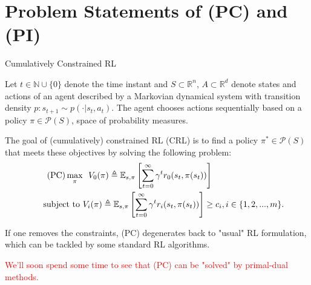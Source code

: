 \documentclass[aspectratio=43, 10pt]{beamer}
\begin{document}
\section{Problem Statements of (PC) and (PI)}    
    \begin{frame}{Cumulatively Constrained RL}

        Let $t \in \mathbb{N} \cup \{0\}$ denote the time instant and $S \subset \mathbb{R}^n$, $A \subset \mathbb{R}^d$ denote states and actions of an agent described by a Markovian dynamical system with transition density $p: s_{t+1} \sim p(\cdot | s_t,a_t)$. The agent chooses actions sequentially based on a policy $\pi \in \mathcal{P}(S)$, space of probability measures.  

        \vspace{0.2cm}

        The goal of (cumulatively) constrained RL (CRL) is to find a policy $\pi^* \in \mathcal{P}(S)$ that meets these objectives by solving the following problem: 
        \begin{align}
            \tag{PC}
            \max_{\pi} &~~ V_0(\pi) \triangleq \mathbb{E}_{s,\pi} \left[ \sum_{t=0}^{\infty} \gamma^t r_0(s_t, \pi(s_t)) \right]  \\
            \text{subject to } & V_i(\pi) \triangleq \mathbb{E}_{s,\pi} \left[\sum_{t=0}^{\infty} \gamma^t r_i(s_t, \pi(s_t))  \right] \geq c_i, i \in \{1,2,...,m\}. \notag
        \end{align}

        \vspace{0.2cm}
        If one removes the constraints, (PC) degenerates back to "usual" RL formulation, which can be tackled by some standard RL algorithms. 

        \textcolor{red}{We'll soon spend some time to see that (PC) can be "solved" by primal-dual methods.}
        
    \end{frame}
\end{document}
